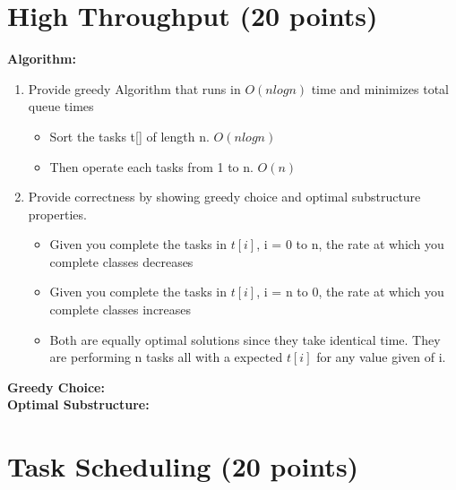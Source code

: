 \documentclass{article}[12pt]
\begin{document}
\section{High Throughput (20 points)}
\noindent\textbf{Algorithm:} \\
\begin{enumerate}
  \item Provide greedy Algorithm that runs in $O(nlogn)$ time and minimizes total queue times
    \begin{itemize}
      \item Sort the tasks t[] of length n. $O(nlogn)$
      \item Then operate each tasks from 1 to n. $O(n)$
    \end{itemize}
  \item Provide correctness by showing greedy choice and optimal substructure properties.
    \begin{itemize}
      \item Given you complete the tasks in $t[i]$, i = 0 to n, the rate at which you complete classes
        decreases
      \item Given you complete the tasks in $t[i]$, i = n to 0, the rate at which you complete classes
        increases
      \item Both are equally optimal solutions since they take identical time.
        They are performing n tasks all with a expected $t[i]$ for any value given of i.
    \end{itemize}
\end{enumerate}

\noindent\textbf{Greedy Choice:} \\
\noindent\textbf{Optimal Substructure:} \\

\newpage
\section{Task Scheduling (20 points)}
\end{document}
